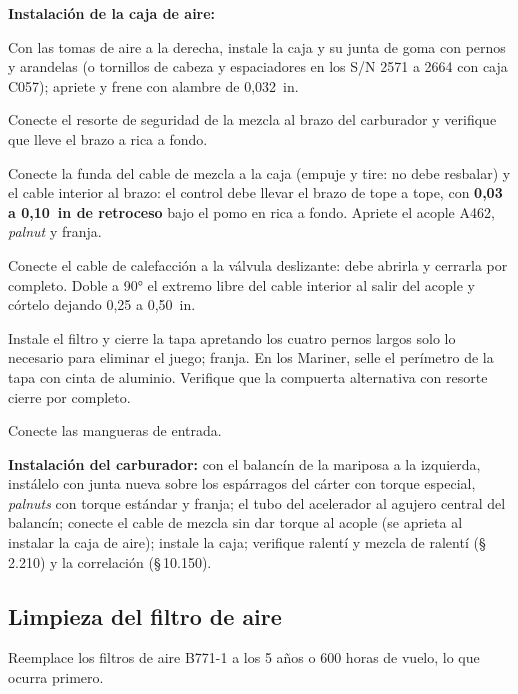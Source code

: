 \textbf{Instalación de la caja de aire:}
\begin{pasos}
\item Con las tomas de aire a la derecha, instale la caja y su junta de goma con pernos y arandelas (o tornillos de cabeza y espaciadores en los S/N 2571 a 2664 con caja C057); apriete y frene con alambre de 0,032~in.
\item Conecte el resorte de seguridad de la mezcla al brazo del carburador y verifique que lleve el brazo a rica a fondo.
\item Conecte la funda del cable de mezcla a la caja (empuje y tire: no debe resbalar) y el cable interior al brazo: el control debe llevar el brazo de tope a tope, con \textbf{0,03 a 0,10~in de retroceso} bajo el pomo en rica a fondo. Apriete el acople A462, \emph{palnut} y franja.
\item Conecte el cable de calefacción a la válvula deslizante: debe abrirla y cerrarla por completo. Doble a 90° el extremo libre del cable interior al salir del acople y córtelo dejando 0,25 a 0,50~in.
\item Instale el filtro y cierre la tapa apretando los cuatro pernos largos solo lo necesario para eliminar el juego; franja. En los Mariner, selle el perímetro de la tapa con cinta de aluminio. Verifique que la compuerta alternativa con resorte cierre por completo.
\item Conecte las mangueras de entrada.
\end{pasos}

\textbf{Instalación del carburador:} con el balancín de la mariposa a la izquierda, instálelo con junta nueva sobre los espárragos del cárter con torque especial, \emph{palnuts} con torque estándar y franja; el tubo del acelerador al agujero central del balancín; conecte el cable de mezcla sin dar torque al acople (se aprieta al instalar la caja de aire); instale la caja; verifique ralentí y mezcla de ralentí (\S\,2.210) y la correlación (\S\,10.150).

\subsection{Limpieza del filtro de aire}

\begin{nota}
Reemplace los filtros de aire B771-1 a los 5 años o 600 horas de vuelo, lo que ocurra primero.
\end{nota}

